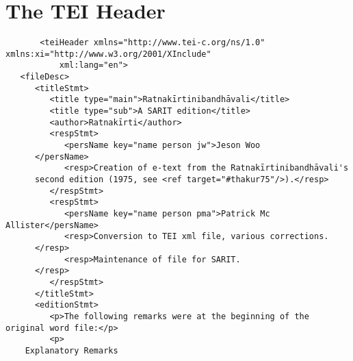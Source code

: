 \documentclass[article,12pt,a4paper]{memoir}
\begin{document}
	 \chapter{The TEI Header}
	 \begin{verbatim}
       <teiHeader xmlns="http://www.tei-c.org/ns/1.0" xmlns:xi="http://www.w3.org/2001/XInclude"
           xml:lang="en">
   <fileDesc>
      <titleStmt>
         <title type="main">Ratnakīrtinibandhāvali</title>
         <title type="sub">A SARIT edition</title>
         <author>Ratnakīrti</author>
         <respStmt>
            <persName key="name person jw">Jeson Woo
	  </persName>
            <resp>Creation of e-text from the Ratnakīrtinibandhāvali's
	  second edition (1975, see <ref target="#thakur75"/>).</resp>
         </respStmt>
         <respStmt>
            <persName key="name person pma">Patrick Mc Allister</persName>
            <resp>Conversion to TEI xml file, various corrections.
	  </resp>
            <resp>Maintenance of file for SARIT.
	  </resp>
         </respStmt>
      </titleStmt>
      <editionStmt>
         <p>The following remarks were at the beginning of the original word file:</p>
         <p>
	Explanatory Remarks


\end{verbatim}
\end{document}
